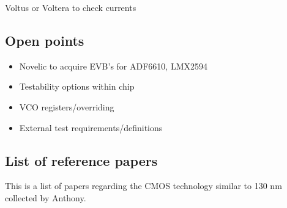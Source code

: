 \documentclass{article}
\begin{document}
Voltus or Voltera to check currents

\subsection{Open points}

\begin{itemize}
	\item Novelic to acquire EVB's for ADF6610, LMX2594 %
	\item Testability options within chip
	\item VCO registers/overriding
	\item External test requirements/definitions
\end{itemize}

\subsection{List of reference papers} %

This is a list of papers regarding the CMOS technology similar to 130 nm collected by Anthony.
\end{document}
